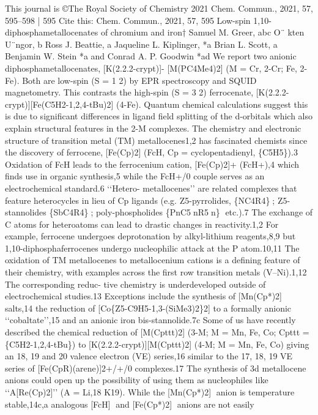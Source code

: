 \documentclass{article}
\begin{document}

This journal is ©The Royal Society of Chemistry 2021
Chem. Commun., 2021, 57, 595--598 | 595
Cite this: Chem. Commun., 2021,
57, 595
Low-spin 1,10-diphosphametallocenates of
chromium and iron†
Samuel M. Greer,
abc O¨ kten U¨ngor,
b Ross J. Beattie,
a
Jaqueline L. Kiplinger,
*a Brian L. Scott,
a Benjamin W. Stein
*a and
Conrad A. P. Goodwin
*ad
We report two anionic diphosphametallocenates, [K(2.2.2-crypt)]-
[M(PC4Me4)2] (M = Cr, 2-Cr; Fe, 2-Fe). Both are low-spin (S = 1
2) by EPR
spectroscopy and SQUID magnetometry. This contrasts the high-spin
(S = 3
2) ferrocenate, [K(2.2.2-crypt)][Fe(C5H2-1,2,4-tBu)2] (4-Fe). Quantum
chemical calculations suggest this is due to significant diﬀerences in
ligand field splitting of the d-orbitals which also explain structural
features in the 2-M complexes.
The chemistry and electronic structure of transition metal (TM)
metallocenes1,2 has fascinated chemists since the discovery of
ferrocene, [Fe(Cp)2] (FcH, Cp = cyclopentadienyl, \{C5H5\}).3
Oxidation of FcH leads to the ferrocenium cation, [Fe(Cp)2]+
(FcH+),4 which finds use in organic synthesis,5 while the FcH+/0
couple
serves
as
an
electrochemical
standard.6
‘‘Hetero-
metallocenes’’ are related complexes that feature heterocycles in
lieu of Cp ligands (e.g. Z5-pyrrolides, \{NC4R4\}; Z5-stannolides
\{SbC4R4\}; poly-phospholides \{PnC5nR5n\} etc.).7 The exchange
of C atoms for heteroatoms can lead to drastic changes in
reactivity.1,2 For example, ferrocene undergoes deprotonation by
alkyl-lithium reagents,8,9 but 1,10-diphosphaferrocenes undergo
nucleophilic attack at the P atom.10,11
The oxidation of TM metallocenes to metallocenium cations
is a defining feature of their chemistry, with examples across the
first row transition metals (V–Ni).1,12 The corresponding reduc-
tive chemistry is underdeveloped outside of electrochemical
studies.13 Exceptions include the synthesis of [Mn(Cp*)2]
salts,14 the reduction of [Co\{Z5-C9H5-1,3-(SiMe3)2\}2] to a formally
anionic ‘‘cobaltate’’,15 and an anionic iron bis-stannolide.7c
Some of us have recently described the chemical reduction of
[M(Cpttt)2] (3-M; M = Mn, Fe, Co; Cpttt = \{C5H2-1,2,4-tBu\}) to
[K(2.2.2-crypt)][M(Cpttt)2] (4-M; M = Mn, Fe, Co) giving an 18,
19 and 20 valence electron (VE) series,16 similar to the 17, 18, 19
VE series of [Fe(CpR)(arene)]2+/+/0 complexes.17
The synthesis of 3d metallocene anions could open up the
possibility of using them as
nucleophiles like ‘‘A[Re(Cp)2]’’
(A = Li,18 K19). While the [Mn(Cp*)2] anion is temperature
stable,14c,a analogous [FcH] and [Fe(Cp*)2] anions are not easily
\end{document}
